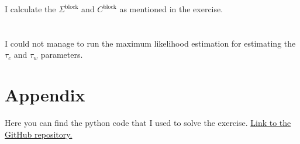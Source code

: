 \documentclass[hidelinks,12pt]{article}
\begin{document}
\FloatBarrier

I calculate the $\Sigma^{\text{block}}$ and $C^{\text{block}}$ as mentioned in the exercise. 

\section{}
I could not manage to run the maximum likelihood estimation for estimating the $\tau_c$ and $\tau_w$ parameters. 

\appendix

\section*{Appendix}

Here you can find the python code that I used to solve the exercise. \href{https://github.com/mortezaaghajanzadeh/BDAP/tree/main/Assignments/Assignment3}{Link to the GitHub repository.}
\end{document}
